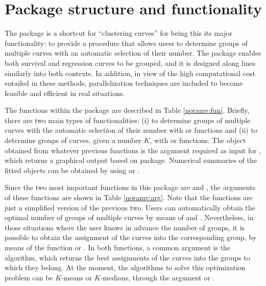 \section{Package structure and functionality}
\label{package}

The  package is a shortcut for ``clustering curves'' for being this its major functionality: to provide a procedure that allows users  to determine groups of  multiple curves with an automatic selection of their number. The package enables both survival and regression curves to be grouped, and it is designed along lines similarly into both contexts.  In addition, in view of the high computational cost entailed in these methods, parallelization techniques are included to become feasible and efficient in real situations.  


The functions within the  package are described in Table \ref{noramv:fun}.  Briefly, there are two main types of functionalities: (i) to determine groups of multiple curves  with the automatic selection of their number with   or  functions and (ii) to determine groups of curves, given a number $K$, with  or  functions. The  object obtained from whatever previous functions is the argument required as input for , which returns a graphical output based on  package. Numerical summaries of the fitted objects can be obtained by using   or .


Since the two most important functions in this package are  and , the arguments of these functions are shown in  Table \ref{noramv:arg}. Note that the   functions are just a simplified version of the previous two.  Users  can automatically obtain  the optimal number of groups of multiple curves by means of   and . Nevertheless, in those situations where the user knows  in advance the number of groups, it is possible to obtain the assignment of the curves into the corresponding group, by means of the function  or .    In both functions, a common argument is the algorithm, which returns the best assignments of the curves into the groups to which they belong. At the moment, the algorithms to solve this optimization problem can be $K$-means or $K$-medians, through the argument  or . 

